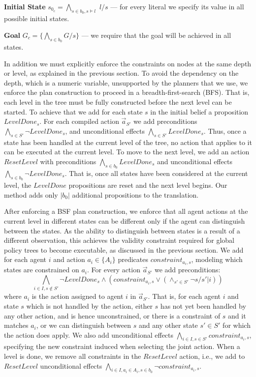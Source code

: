 \documentclass[letterpaper]{article}
\newcommand{\set}[1]{\{#1\}}
\theoremstyle{definition}
\begin{document}
{\bf Initial State} $s_{0_c} = \bigwedge_{s\in b_0,s\models l} $ $l/s$ --- for every literal we specify its value in all possible initial states.

{\bf Goal} $G_c = \{\bigwedge_{s \in b_0} G/s \}$ --- we require that the goal will be achieved in all states.

In addition we must explicitly enforce the constraints on nodes at the same depth or level, as explained in the previous section.
To avoid the dependency on the depth, which is a numeric variable, unsupported by the planners that we use, we enforce the plan construction to proceed in a breadth-first-search (BFS). That is, each level in the tree must be fully constructed before the next level can be started.
To achieve that we add for each state $s$ in the initial belief a proposition $LevelDone_s$. For each compiled action $\vec{a}_{S'}$ we add preconditions $\bigwedge_{s \in S'}\neg LevelDone_s$, and unconditional effects $\bigwedge_{s \in S'} LevelDone_s$. Thus, once a state has been handled at the current level of the tree, no action that applies to it can be executed at the current level.
To move to the next level, we add an action $ResetLevel$ with preconditions $\bigwedge_{s \in b_0}LevelDone_s$ and unconditional effects $\bigwedge_{s \in b_0}\neg LevelDone_s$. That is, once all states have been considered at the current level, the $LevelDone$ propositions are reset and the next level begins. Our method adds only $|b_0|$ additional propositions to the translation.


After enforcing a BSF plan construction, we enforce that all agent actions at the current level in different states can be different only if the agent can distinguish between the states. As the ability to distinguish between states is a result of a different observation, this achieves the validity constraint required for global policy trees to become executable, as discussed in the previous section.
We add for each agent $i$ and action $a_i\in \set{A_i}$ predicates $constraint_{a_i,s}$, modeling which states are constrained on $a_i$. For every action $\vec{a}_{S'}$ we add preconditions:
$$\bigwedge_{i \in I,s \notin S'} \neg LevelDone_s \wedge ( constraint_{a_i,s} \vee (\wedge_{s' \in S'} \neg s/s'|i))$$ where $a_i$ is the action assigned to agent $i$ in $\vec{a}_{S'}$. That is, for each agent $i$ and state $s$ which is not handled by the action, either $s$ has not yet been handled by any other action, and is hence unconstrained, or there is a constraint of $s$ and it matches $a_i$, or we can distinguish between $s$ and any other state $s' \in S'$ for which the action does apply. We also add unconditional effects $\bigwedge_{i \in I,s \in S'} constraint_{a_i,s}$, specifying the new constraint induced when selecting the joint action. When a level is done, we remove all constraints in the $ResetLevel$ action, i.e., we add to $ResetLevel$ unconditional effects $\bigwedge_{i \in I, a_i \in A_i, s \in b_0} \neg constraint_{a_i,s}$.
\end{document}
